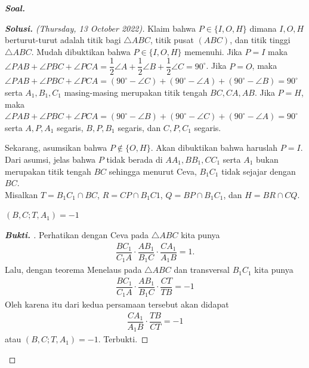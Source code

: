 \textbf{\textit{Soal. }}

\begin{proof}[\textbf{Solusi. }(Thursday, 13 October 2022)] 
Klaim bahwa $P \in \{I,O,H\}$ dimana $I,O,H$ berturut-turut adalah titik bagi $\triangle ABC$, titik pusat $(ABC)$, dan titik tinggi $\triangle ABC$. Mudah dibuktikan bahwa $P \in \{I,O,H\}$ memenuhi. Jika $P=I$ maka $\angle PAB + \angle PBC + \angle PCA = \dfrac{1}{2}\angle A + \dfrac{1}{2}\angle B + \dfrac{1}{2}\angle C = 90^{\circ}$. Jika $P=O$, maka $\angle PAB + \angle PBC + \angle PCA = (90^{\circ} - \angle C) + (90^{\circ} - \angle A)+(90^{\circ}-\angle B) = 90^{\circ}$ serta $A_1,B_1,C_1$ masing-masing merupakan titik tengah $BC,CA,AB$. Jika $P=H$, maka $\angle PAB + \angle PBC + \angle PCA = (90^{\circ} - \angle B) + (90^{\circ} - \angle C)+(90^{\circ}-\angle A) = 90^{\circ}$ serta $A,P,A_1$ segaris, $B,P,B_1$ segaris, dan $C,P,C_1$ segaris.

Sekarang, asumsikan bahwa $P \not \in \{O,H\}$. Akan dibuktikan bahwa haruslah $P=I$. Dari asumsi, jelas bahwa $P$ tidak berada di $AA_1, BB_1, CC_1$ serta $A_1$ bukan merupakan titik tengah $BC$ sehingga menurut Ceva, $B_1C_1$ tidak sejajar dengan $BC$.\\

% 


Misalkan $T=B_1C_1 \cap BC$, $R = CP \cap B_1C1$, $Q = BP \cap B_1C_1$, dan $H = BR \cap CQ$.

\begin{lemmarev}
    $(B,C;T,A_1)=-1$
    \begin{proof}[\textbf{Bukti. }]
        Perhatikan dengan Ceva pada $\triangle ABC$ kita punya
        \begin{align*}
            \dfrac{BC_1}{C_1A} \cdot \dfrac{AB_1}{B_1C} \cdot \dfrac{CA_1}{A_1B} = 1.
        \end{align*}
        Lalu, dengan teorema Menelaus pada $\triangle ABC$ dan transversal $B_1C_1$ kita punya
        \begin{align*}
            \dfrac{BC_1}{C_1A}\cdot\dfrac{AB_1}{B_1C}\cdot\dfrac{CT}{TB} = -1
        \end{align*}
        Oleh karena itu dari kedua persamaan tersebut akan didapat
        \begin{align*}
            \dfrac{CA_1}{A_1B} \cdot \dfrac{TB}{CT} = -1
        \end{align*}
        atau $(B,C;T,A_1)=-1$. Terbukti.
    \end{proof}
\end{lemmarev}


\end{proof}
